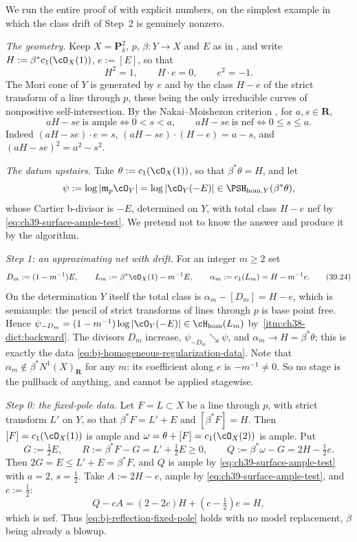 \begin{example}
\label{ex:ch39-blowup-reflection-numbers}
We run the entire proof of  with
explicit numbers, on the simplest example in which the class drift of
Step~2 is genuinely nonzero.

\emph{The geometry.}  Keep $X=\mathbf P^2_k$, $p$, $\beta:Y\to X$ and
$E$ as in , and write
$H:=\beta^*c_1(\cO_X(1))$, $e:=[E]$, so that
\[
 H^2=1,\qquad H\cdot e=0,\qquad e^2=-1 .
\tag{39.22}\label{eq:ch39-surface-intersection}
\]
The Mori cone of $Y$ is generated by $e$ and by the class $H-e$ of the
strict transform of a line through $p$, these being the only irreducible
curves of nonpositive self-intersection.  By the Nakai--Moishezon criterion
\cite[Theorem~1.2.23]{PAG1}, for $a,s\in\mathbf R$,
\[
 aH-se\ \text{is ample}\iff 0<s<a,
 \qquad
 aH-se\ \text{is nef}\iff 0\le s\le a .
\tag{39.23}\label{eq:ch39-surface-ample-test}
\]
Indeed $(aH-se)\cdot e=s$, $(aH-se)\cdot(H-e)=a-s$, and
$(aH-se)^2=a^2-s^2$.

\emph{The datum upstairs.}  Take $\theta:=c_1(\cO_X(1))$, so that
$\beta^*\theta=H$, and let
\[
 \psi:=\log|\mathfrak m_p\cO_Y|=\log|\cO_Y(-E)|
 \in\PSH_{\mathrm{hom},Y}(\beta^*\theta),
\]
whose Cartier b-divisor is $-E$, determined on $Y$, with total class
$H-e$ nef by \eqref{eq:ch39-surface-ample-test}.  We pretend not to know
the answer and produce it by the algorithm.

\emph{Step 1: an approximating net with drift.}  For an integer $m\ge2$
set
\[
 D_m:=(1-m^{-1})E,
 \qquad
 L_m:=\beta^*\cO_X(1)-m^{-1}E,
 \qquad
 \alpha_m:=c_1(L_m)=H-m^{-1}e .
\tag{39.24}\label{eq:ch39-surface-stages}
\]
On the determination $Y$ itself the total class is
$\alpha_m-[D_m]=H-e$, which is semiample: the pencil of strict transforms
of lines through $p$ is base point free.  Hence
$\psi_{-D_m}=(1-m^{-1})\log|\cO_Y(-E)|\in\cH_{\mathrm{hom}}(L_m)$ by
\,\cref{itm:ch38-dict:backward}.  The
divisors $D_m$ increase, $\psi_{-D_m}\searrow\psi$, and
$\alpha_m\to H=\beta^*\theta$; this is exactly the data
\eqref{eq:bj-homogeneous-regularization-data}.  Note that
$\alpha_m\notin\beta^*N^1(X)_{\mathbf R}$ for any $m$: its coefficient
along $e$ is $-m^{-1}\ne0$.  So no stage is the pullback of anything,
and  cannot be applied stagewise.

\emph{Step 0: the fixed-pole data.}  Let $F=L\subset X$ be a line through
$p$, with strict transform $L'$ on $Y$, so that
$\beta^*F=L'+E$ and $[\beta^*F]=H$.  Then $[F]=c_1(\cO_X(1))$ is ample
and $\omega=\theta+[F]=c_1(\cO_X(2))$ is ample.  Put
\[
 G:=\tfrac12E,\qquad
 R:=\beta^*F-G=L'+\tfrac12E\ge0,\qquad
 Q:=\beta^*\omega-G=2H-\tfrac12e .
\tag{39.25}\label{eq:ch39-surface-fixed-pole}
\]
Then $2G=E\le L'+E=\beta^*F$, and $Q$ is ample by
\eqref{eq:ch39-surface-ample-test} with $a=2$, $s=\frac12$.  Take
$A:=2H-e$, ample by \eqref{eq:ch39-surface-ample-test}, and $c:=\frac12$:
\[
 Q-cA=(2-2c)H+(c-\tfrac12)e=H,
\]
which is nef.  Thus \eqref{eq:bj-reflection-fixed-pole} holds with no model
replacement, $\beta$ being already a blowup.


\end{example}
